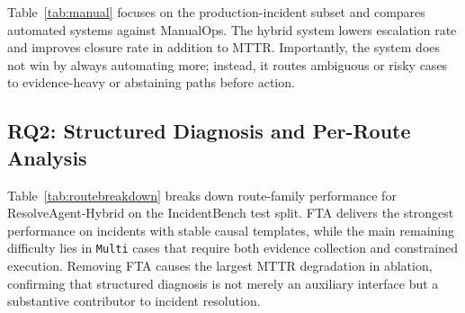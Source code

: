 \documentclass[conference]{IEEEtran}
\begin{document}
Table~\ref{tab:manual} focuses on the production-incident subset and compares automated systems against ManualOps. The hybrid system lowers escalation rate and improves closure rate in addition to MTTR. Importantly, the system does not win by always automating more; instead, it routes ambiguous or risky cases to evidence-heavy or abstaining paths before action.

\begin{table}[t]
\centering
\caption{IncidentBench comparison against manual handling.}
\label{tab:manual}
\end{table}

\subsection{RQ2: Structured Diagnosis and Per-Route Analysis}
Table~\ref{tab:routebreakdown} breaks down route-family performance for ResolveAgent-Hybrid on the IncidentBench test split. FTA delivers the strongest performance on incidents with stable causal templates, while the main remaining difficulty lies in \texttt{Multi} cases that require both evidence collection and constrained execution. Removing FTA causes the largest MTTR degradation in ablation, confirming that structured diagnosis is not merely an auxiliary interface but a substantive contributor to incident resolution.

\begin{table}[t]
\centering
\caption{Per-route performance of ResolveAgent-Hybrid on IncidentBench test cases.}
\label{tab:routebreakdown}
\end{table}
\end{document}
